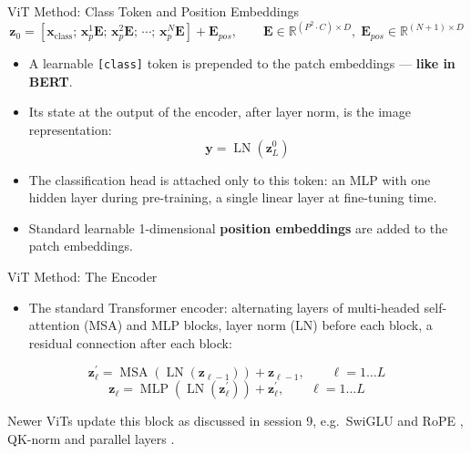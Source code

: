 \begin{frame}{ViT Method: Class Token and Position Embeddings}
\small%
\[
\mathbf{z}_{0} = \left[\mathbf{x}_{\text{class}};\, \mathbf{x}_{p}^{1}\mathbf{E};\, \mathbf{x}_{p}^{2}\mathbf{E};\, \cdots;\, \mathbf{x}_{p}^{N}\mathbf{E}\right] + \mathbf{E}_{pos},
\qquad \mathbf{E} \in \mathbb{R}^{(P^{2} \cdot C) \times D},\; \mathbf{E}_{pos} \in \mathbb{R}^{(N+1) \times D}
\]
\begin{itemize}
  \item A learnable \texttt{[class]} token is prepended to the patch embeddings --- \textbf{like in BERT}.
  \item Its state at the output of the encoder, after layer norm, is the image representation:
  \[ \mathbf{y} = \operatorname{LN}\left(\mathbf{z}_{L}^{0}\right) \]
  \item The classification head is attached only to this token: an MLP with one hidden layer during pre-training, a single linear layer at fine-tuning time.
  \item Standard learnable 1-dimensional \textbf{position embeddings} are added to the patch embeddings.
\end{itemize}
\end{frame}

\begin{frame}{ViT Method: The Encoder}
\begin{itemize}
  \item The standard Transformer encoder: alternating layers of multi-headed self-attention (MSA) and MLP blocks, layer norm (LN) before each block, a residual connection after each block:
\end{itemize}
\[
\mathbf{z}_{\ell}^{\prime} = \operatorname{MSA}\left(\operatorname{LN}\left(\mathbf{z}_{\ell-1}\right)\right) + \mathbf{z}_{\ell-1}, \qquad \ell = 1 \ldots L
\]
\[
\mathbf{z}_{\ell} = \operatorname{MLP}\left(\operatorname{LN}\left(\mathbf{z}_{\ell}^{\prime}\right)\right) + \mathbf{z}_{\ell}^{\prime}, \qquad \ell = 1 \ldots L
\]
\vfill
{\footnotesize Newer ViTs update this block as discussed in session 9, e.g.\ SwiGLU and RoPE , QK-norm and parallel layers .\par}
\end{frame}

